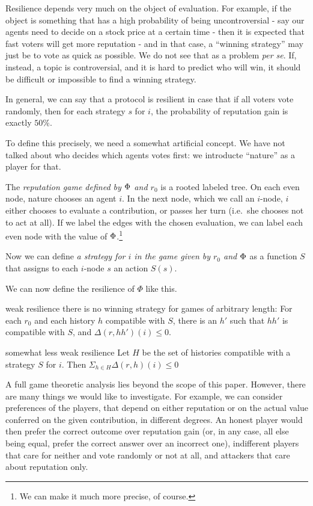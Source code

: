 \documentclass{article}
\begin{document}
Resilience depends very much on the object of evaluation. For example, if the object is something that has a high probability of being uncontroversial - say our agents need to decide on a stock price at a certain time - then it is expected that fast voters will get more reputation - and in that case, a ``winning strategy'' may just be to vote as quick as possible. We do not see that as a problem {\em per se}.
If, instead, a topic is controversial, and it is hard to predict who will win, it should be difficult or impossible to find a winning strategy. 

In general, we can say that a protocol is resilient in case that if all voters vote randomly, then for each strategy $s$ for $i$, the probability of reputation gain is exactly $50\%$.

To define this precisely, we need a somewhat artificial concept. We have not talked about who decides which agents votes first: we introducte ``nature'' as a player for that.

The {\em reputation game defined by $\Phi$ and $r_0$} is a rooted labeled tree. On each even node, nature chooses an agent $i$. In the next node, which we call an $i$-node, $i$ either chooses to evaluate a contribution, or passes her turn (i.e.\ she chooses not to act at all). 
If we label the edges with the chosen evaluation, we can label each even node with the value of $\Phi$.\footnote{We can make it much more precise, of course.}

Now we can define {\em a strategy for $i$ in the game given by $r_0$ and $\Phi$} as a function $S$ that assigns to each $i$-node $s$ an action $S(s)$.

We can now define the resilience of $\Phi$ like this. 

\begin{condition}{weak resilience} 
there is no winning strategy for games of arbitrary length: For each $r_0$ and each history $h$ compatible with $S$, there is an $h'$ such that $hh'$ is compatible with $S$, and $\Delta(r, hh')(i) \leq 0$.
\end{condition}
\begin{condition}{somewhat less weak resilience} 
Let $H$ be the set of histories compatible with a strategy $S$ for $i$. Then $\Sigma_{h\in H} \Delta(r, h)(i) \leq 0$
\end{condition}
A full game theoretic analysis lies beyond the scope of this paper. However, there are many things we would like to investigate. For example, we can consider preferences of the players, that depend on either reputation or on the actual value conferred on the given contribution, in different degrees. An honest player would then prefer the correct outcome over reputation gain (or, in any case, all else being equal, prefer the correct answer over an incorrect one), indifferent players that care for neither and vote randomly or not at all, and attackers that care about reputation only. 
\end{document}
